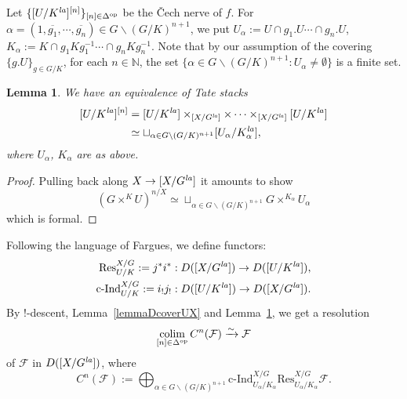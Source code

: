 \documentclass[a4paper,10pt]{amsart}
\theoremstyle{remark}
\theoremstyle{definition}
\theoremstyle{plain}
\newtheorem{lemma}[theorem]{Lemma}
\numberwithin{equation}{section}
\newcommand{\bbN}{{\mathbb N}}
\newcommand{\calF}{{\mathcal F}}
\newcommand{\la}{{\it la}}
\newcommand{\cInd}{\mathrm{c\text{-}Ind}}
\newcommand{\Res}{\mathrm{Res}}
\DeclareMathOperator{\colim}{colim}
\begin{document}
Let $\{[U/K^{\la}]^{[n]}\}_{[n]\in \Delta^{\rm op}}$ be the \v{C}ech nerve of $f$. For $\alpha=(1,\overline{g_1},\cdots,\overline{g_n})\in G\backslash(G/K)^{n+1}$, we put $U_{\alpha}:=U\cap g_1.U\cdots \cap g_n.U$, $K_\alpha:=K\cap g_{1}Kg_1^{-1}\cdots \cap g_nKg_n^{-1}$. Note that by our assumption of the covering $\{g.U\}_{g\in G/K}$, for each $n\in \bbN$, the set $\{\alpha\in G\backslash(G/K)^{n+1}: U_\alpha\neq \emptyset\}$ is a finite set. 
\begin{lemma}\label{lemmaCechnerveUK}
	We have an equivalence of Tate stacks
	\begin{equation*}
		\begin{aligned}
			{[U/K^{\la}]^{[n]}}&=[U/K^{\la}]\times_{[X/G^{\la}]}\times\cdots\times_{[X/G^{\la}]}[U/K^{\la}]\\
			&\simeq \sqcup_{\alpha\in G\backslash(G/K)^{n+1}} [U_{\alpha}/K_{\alpha}^{\la}],
		\end{aligned}
	\end{equation*}
	where \(U_{\alpha}\), \(K_{\alpha}\) are as above.
\end{lemma}
\begin{proof}
	Pulling back along $X\to [X/G^{\la}]$  it amounts to show 
	\[(G\times^KU)^{n/X}\simeq \sqcup_{\alpha\in G\backslash(G/K)^{n+1}} G\times^{K_{\alpha}}U_{\alpha}\] which is formal.
\end{proof} 
Following the language of Fargues, we define functors: 
\begin{equation*}
	\begin{aligned}
		\Res^{X/G}_{U/K}:=j^*i^*:D([X/G^{\la}])\rightarrow D([U/K^{\la}]),\\
		\cInd^{X/G}_{U/K}:=i_!j_!:D([U/K^{\la}])\rightarrow D([X/G^{\la}]).
	\end{aligned}
\end{equation*}
By $!$-descent, Lemma~\ref{lemmaDcoverUX} and Lemma~\ref{lemmaCechnerveUK}, we get a resolution
\begin{equation}\label{equationresolutionsheafC}
	\colim_{[n]\in \Delta^{\rm op}} C^n(\calF)\xrightarrow{\sim} \calF
\end{equation} 
of $\calF$ in $D([X/G^{\la}])$, where 
$$C^n(\calF):=\bigoplus_{\alpha \in G\backslash (G/K)^{n+1}} \cInd^{X/G}_{U_{\alpha}/K_{\alpha}}\Res^{X/G}_{U_{\alpha}/K_{\alpha}} \calF.$$
\end{document}
